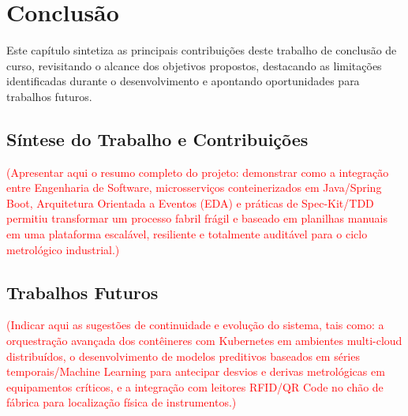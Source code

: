 \chapter{Conclusão}

Este capítulo sintetiza as principais contribuições deste trabalho de conclusão de curso, revisitando o alcance dos objetivos propostos, destacando as limitações identificadas durante o desenvolvimento e apontando oportunidades para trabalhos futuros.

\section{Síntese do Trabalho e Contribuições}

\textcolor{red}{(Apresentar aqui o resumo completo do projeto: demonstrar como a integração entre Engenharia de Software, microsserviços conteinerizados em Java/Spring Boot, Arquitetura Orientada a Eventos (EDA) e práticas de Spec-Kit/TDD permitiu transformar um processo fabril frágil e baseado em planilhas manuais em uma plataforma escalável, resiliente e totalmente auditável para o ciclo metrológico industrial.)}

\section{Trabalhos Futuros}

\textcolor{red}{(Indicar aqui as sugestões de continuidade e evolução do sistema, tais como: a orquestração avançada dos contêineres com Kubernetes em ambientes multi-cloud distribuídos, o desenvolvimento de modelos preditivos baseados em séries temporais/Machine Learning para antecipar desvios e derivas metrológicas em equipamentos críticos, e a integração com leitores RFID/QR Code no chão de fábrica para localização física de instrumentos.)}
